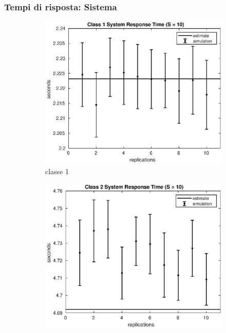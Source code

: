 \subsubsection{Tempi di risposta: Sistema}
%
\begin{figure}[!h]
\centering
%
\begin{subfigure}[t]{0.49\textwidth}
\includegraphics[width=\textwidth]{figures/simul/10_500K_s1}
\caption{classe 1}
\label{10_s1}
\end{subfigure}
%
\begin{subfigure}[t]{0.49\textwidth}
\includegraphics[width=\textwidth]{figures/simul/10_500K_s2}

\end{subfigure}
\end{figure}
